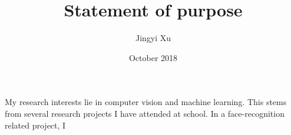 \documentclass{article}
\title{Statement of purpose}
\author{Jingyi Xu}
\date{October 2018}
\begin{document}
\begin{Large}
\maketitle

\par{%
My research interests lie in computer vision and machine learning.
%
This stems from several research projects I have attended at school.
%
In a face-recognition related project, I 
}


\end{Large}
\end{document}
